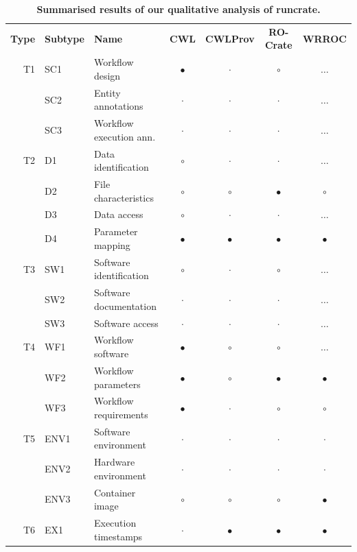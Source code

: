\documentclass[10pt,letterpaper]{article}
\newlength\savedwidth
\newcommand\thickhline{\noalign{\global\savedwidth\arrayrulewidth\global\arrayrulewidth 2pt}%
\hline
\noalign{\global\arrayrulewidth\savedwidth}}
\begin{document}
\begin{table}[!ht]
\begin{adjustwidth}{-1.4cm}{0in} %
\centering
\caption{
{\bf Summarised results of our qualitative analysis of runcrate.}}
\begin{tabular}{r|l|l|c|c|c|c}
\hline
{\bf Type} & {\bf Subtype}      & {\bf Name} & {\bf CWL} & {\bf CWLProv} & {\bf RO-Crate} & {\bf WRROC}  \\ \thickhline
T1 & SC1 & Workflow design      & $\bullet$ &  $\cdot$ & $\circ$ & $\dots$ \\ 
& SC2 & Entity annotations      & $\cdot$ &  $\cdot$ &  $\cdot$  & $\dots$ \\ 
& SC3 & Workflow execution ann. &  $\cdot$  & $\cdot$ &  $\cdot$ & $\dots$ \\ \hline
T2 & D1 & Data identification   & $\circ$ & $\cdot$ &  $\cdot$ & $\dots$ \\
& D2 & File characteristics     & $\circ$ & $\circ$ & $\bullet$ & $\circ$ \\
& D3 & Data access              & $\circ$ &  $\cdot$ &  $\cdot$  & $\dots$ \\ 
& D4 & Parameter mapping        & $\bullet$ & $\bullet$ & $\bullet$ & $\bullet$ \\ \hline 
T3 & SW1 & Software identification & $\circ$ &  $\cdot$ & $\circ$ & $\dots$ \\ 
& SW2 & Software documentation  & $\cdot$ &  $\cdot$ & $\cdot$ & $\dots$ \\  
& SW3 & Software access         & $\cdot$ &  $\cdot$ & $\cdot$ & $\dots$ \\ \hline 
T4 & WF1 & Workflow software    & $\bullet$ & $\circ$ & $\circ$ & $\dots$ \\ 
& WF2 & Workflow parameters     & $\bullet$ & $\circ$ & $\bullet$ & $\bullet$ \\ 
& WF3 & Workflow requirements   & $\bullet$ &  $\cdot$  &  $\circ$  & $\circ$ \\ \hline 
T5 & ENV1 & Software environment & $\cdot$ & $\cdot$ &  $\cdot$ & $\cdot$ \\ 
& ENV2 & Hardware environment   & $\cdot$ & $\cdot$ &  $\cdot$  & $\cdot$\\ 
& ENV3 & Container image        & $\circ$ & $\circ$ &  $\circ$ & $\bullet$ \\ \hline 
T6 & EX1 & Execution timestamps & $\cdot$ & $\bullet$ & $\bullet$ & $\bullet$ \\ 

\end{tabular}
\end{adjustwidth}
\end{table}
\end{document}
